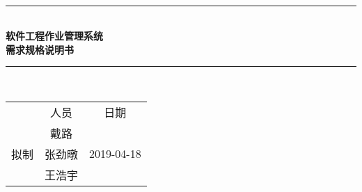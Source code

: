 \documentclass[bachelor]{ustcthesis}
\newcommand{\docname}{软件工程作业管理系统}
\newcommand{\HRule}{\rule{\linewidth}{0.5mm}}
\begin{document}
\begin{titlepage}
\begin{center}
~\\[5cm]
\HRule \\[0.4cm]
{\huge \bfseries \docname\\需求规格说明书}\\[0.4cm]
\HRule \\[1.5cm]

\begin{tabular}{ccc}
  & 人员 & 日期 \\ 
 &  戴路  &  \\ 
拟制 &  张劲暾 & 2019-04-18 \\ 
 &  王浩宇 &  \\ 
\end{tabular} 

\end{center}
\end{titlepage}



\frontmatter

\tableofcontents
\listoffigures
\listoftables
% 

\mainmatter









%


\appendix


\end{document}
